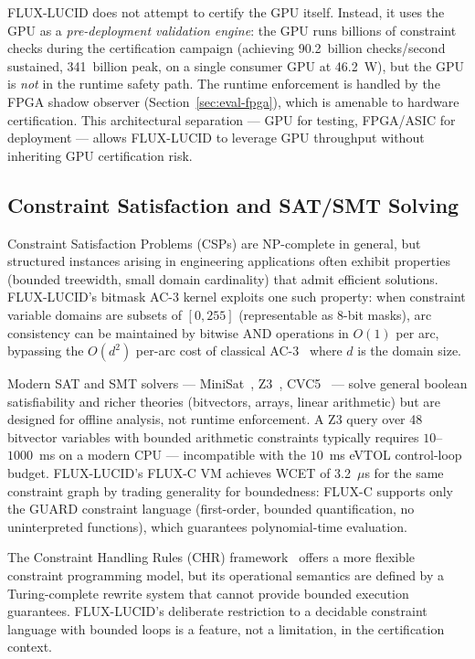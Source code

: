 \documentclass[sigplan,review,anonymous]{acmart}
\begin{document}
FLUX-LUCID does not attempt to certify the GPU itself. Instead, it uses
the GPU as a \emph{pre-deployment validation engine}: the GPU runs billions
of constraint checks during the certification campaign (achieving
90.2~billion checks/second sustained, 341~billion peak, on a single
consumer GPU at 46.2~W), but the GPU is \emph{not} in the runtime safety
path. The runtime enforcement is handled by the FPGA shadow observer
(Section~\ref{sec:eval-fpga}), which is amenable to hardware certification.
This architectural separation — GPU for testing, FPGA/ASIC for deployment —
allows FLUX-LUCID to leverage GPU throughput without inheriting GPU
certification risk.

\subsection{Constraint Satisfaction and SAT/SMT Solving}
\label{sec:related-csp}

Constraint Satisfaction Problems (CSPs) are NP-complete in general, but
structured instances arising in engineering applications often exhibit
properties (bounded treewidth, small domain cardinality) that admit
efficient solutions. FLUX-LUCID's bitmask AC-3 kernel exploits one such
property: when constraint variable domains are subsets of $[0, 255]$
(representable as 8-bit masks), arc consistency can be maintained by
bitwise AND operations in $O(1)$ per arc, bypassing the $O(d^2)$
per-arc cost of classical AC-3~\cite{mackworth1977} where $d$ is the
domain size.

Modern SAT and SMT solvers — MiniSat~\cite{een2003minisat},
Z3~\cite{demoura2008z3}, CVC5~\cite{barbosa2022cvc5} — solve
general boolean satisfiability and richer theories (bitvectors, arrays,
linear arithmetic) but are designed for offline analysis, not runtime
enforcement. A Z3 query over 48 bitvector variables with bounded arithmetic
constraints typically requires $10$--$1000$~ms on a modern CPU —
incompatible with the $10$~ms eVTOL control-loop budget. FLUX-LUCID's
FLUX-C VM achieves WCET of 3.2~$\mu$s for the same constraint graph by
trading generality for boundedness: FLUX-C supports only the GUARD
constraint language (first-order, bounded quantification, no uninterpreted
functions), which guarantees polynomial-time evaluation.

The Constraint Handling Rules (CHR) framework~\cite{fruhwirth1998chr}
offers a more flexible constraint programming model, but its operational
semantics are defined by a Turing-complete rewrite system that cannot
provide bounded execution guarantees. FLUX-LUCID's deliberate restriction
to a decidable constraint language with bounded loops is a feature, not
a limitation, in the certification context.
\end{document}
